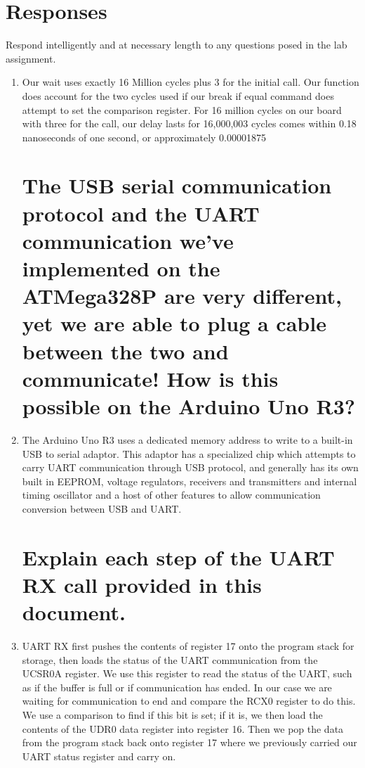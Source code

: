 \documentclass[letterpaper,11pt]{texMemo} %
\begin{document}
\section*{Responses}
Respond intelligently and at necessary length to any questions posed in the lab assignment.
\begin{enumerate}

\section{It is extremely unlikely that your one-second delay is exactly one second. How many clock
cycles are actually consumed inside your one-second delay? What is your relative error?}

\item Our wait uses exactly 16 Million cycles plus 3 for the initial call. Our function does account for the two cycles used if our break if equal command does attempt to set the comparison register. For 16 million cycles on our board with three for the call, our delay lasts for 16,000,003 cycles comes within 0.18 nanoseconds of one second, or approximately 0.00001875%

\section{The USB serial communication protocol and the UART communication we’ve implemented
on the ATMega328P are very different, yet we are able to plug a cable between the two and
communicate! How is this possible on the Arduino Uno R3?}

\item The Arduino Uno R3 uses a dedicated memory address to write to a built-in USB to serial adaptor. This adaptor has a specialized chip which attempts to carry UART communication through USB protocol, and generally has its own built in EEPROM, voltage regulators, receivers and transmitters and internal timing oscillator and a host of other features to allow communication conversion between USB and UART.

\section{Explain each step of the UART RX call provided in this document.}

\item UART RX first pushes the contents of register 17 onto the program stack for storage, then loads the status of the UART communication from the UCSR0A register. We use this register to read the status of the UART, such as if the buffer is full or if communication has ended. In our case we are waiting for communication to end and compare the RCX0 register to do this. We use a comparison to find if this bit is set; if it is, we then load the contents of the UDR0 data register into register 16. Then we pop the data from the program stack back onto register 17 where we previously carried our UART status register and carry on.

\end{enumerate}
\end{document}
